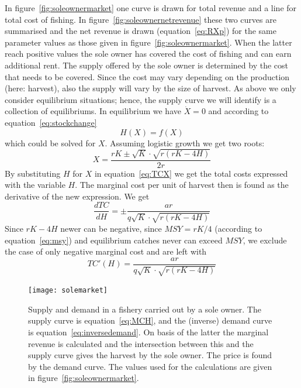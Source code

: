 \documentclass[11pt,fleqn]{book} %
\begin{document}
In figure~\ref{fig:soleownermarket} one curve is drawn for total revenue and a line for total cost of fishing. In figure~\ref{fig:soleownernetrevenue} these two curves are summarised and the net revenue is drawn (equation~\ref{eq:RXp}) for the same parameter values as those given in figure~\ref{fig:soleownermarket}. When the latter reach positive values the sole owner has covered the cost of fishing and can earn additional rent. The supply offered by the sole owner is determined by the cost that needs to be covered. Since the cost may vary depending on the production (here: harvest), also the supply will vary by the size of harvest. As above we only consider equilibrium situations; hence, the supply curve we will identify is a collection of equilibriums. In equilibrium we have $\dot{X} = 0$ and according to equation~\ref{eq:stockchange}
\begin{equation*} 
H(X) = f(X)
\end{equation*}
which could be solved for $X$. Assuming logistic growth we get two roots:
\begin{equation} 
\label{eq:Xsol}
X = \frac{r K \pm \sqrt{K} \cdot \sqrt{r ( r K - 4 H)}}{2 r}
\end{equation}
By substituting $H$ for $X$ in equation~\ref{eq:TCX} we get the total costs expressed with the variable $H$. The marginal cost per unit of harvest then is found as the derivative of the new expression. We get
\begin{equation*} 
\frac{d TC}{d H} = \pm \frac{a r}{q \sqrt{K} \cdot \sqrt{r ( r K - 4 H)}}
\end{equation*}
Since $r K - 4 H$ newer can be negative, since $MSY = r K/4$ (according to equation~\ref{eq:msy}) and equilibrium catches never can exceed $MSY$, we exclude the case of only negative marginal cost and are left with
\begin{equation} 
\label{eq:MCH}
TC'(H) = \frac{a r}{q \sqrt{K} \cdot \sqrt{r ( r K - 4 H)}}
\end{equation}

\begin{figure}[ht]
\centering
\texttt{[image: solemarket]}
\caption{Supply and demand in a fishery carried out by a sole owner. The supply curve is equation~\ref{eq:MCH}, and the (inverse) demand curve is equation~\ref{eq:inversedemand}. On basis of the latter the marginal revenue is calculated and the intersection between this and the supply curve gives the harvest by the sole owner. The price is found by the demand curve. The values used for the calculations are given in figure~\ref{fig:soleownermarket}.} 
\label{fig:solemarket}
\end{figure}
\end{document}
